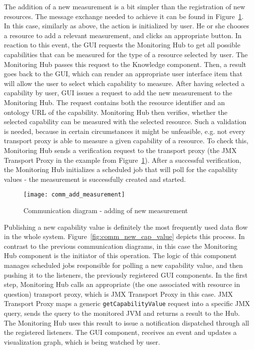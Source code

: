 The addition of a new measurement is a bit simpler than the registration of new resources. The message exchange needed to achieve it can be found in Figure~\ref{fig:comm_add_measurement}. In this case, similarly as above, the action is initialized by user. He or she chooses a resource to add a relevant measurement, and clicks an appropriate button. In reaction to this event, the GUI requests the Monitoring Hub to get all possible capabilities that can be measured for the type of a resource selected by user. The Monitoring Hub passes this request to the Knowledge component. Then, a result goes back to the GUI, which can render an appropriate user interface item that will allow the user to select which capability to measure. After having selected a capability by user, GUI issues a request to add the new measurement to the Monitoring Hub. The request contains both the resource identifier and an ontology URL of the capability. Monitoring Hub then verifies, whether the selected capability can be measured with the selected resource. Such a validation is needed, because in certain circumstances it might be unfeasible, e.g. not every transport proxy is able to measure a given capability of a resource. To check this, Monitoring Hub sends a verification request to the transport proxy (the JMX Transport Proxy in the example from Figure~\ref{fig:comm_add_measurement}). After a successful verification, the Monitoring Hub initializes a scheduled job that will poll for the capability values - the measurement is successfully created and started.

\begin{figure}[ht]
\centering
\texttt{[image: comm\_add\_measurement]}
\caption{Communication diagram - adding of new measurement}
\label{fig:comm_add_measurement}
\end{figure}

Publishing a new capability value is definitely the most frequently used data flow in the whole system. Figure~\ref{fig:comm_new_cap_value} depicts this process. In contrast to the previous communication diagrams, in this case the Monitoring Hub component is the initiator of this operation. The logic of this component manages scheduled jobs responsible for polling a new capability value, and then pushing it to the listeners, the previously registered GUI components. In the first step, Monitoring Hub calls an appropriate (the one associated with resource in question) transport proxy, which is JMX Transport Proxy in this case. JMX Transport Proxy maps a generic \texttt{getCapabilityValue} request into a specific JMX query, sends the query to the monitored JVM and returns a result to the Hub. The Monitoring Hub uses this result to issue a notification dispatched through all the registered listeners. The GUI component, receives an event and updates a visualization graph, which is being watched by user.


